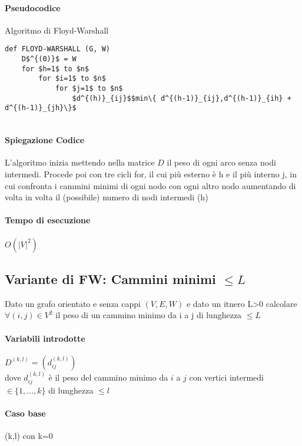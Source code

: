 \documentclass[12pt, a4paper, openany]{book}
\begin{document}
\paragraph{Pseudocodice} Algoritmo di Floyd-Warshall

\begin{lstlisting}
def FLOYD-WARSHALL (G, W)
    D$^{(0)}$ = W
    for $h=1$ to $n$
        for $i=1$ to $n$
            for $j=1$ to $n$
                $d^{(h)}_{ij}$$min\{ d^{(h-1)}_{ij},d^{(h-1)}_{ih} + d^{(h-1)}_{jh}\}$


\end{lstlisting}

\paragraph{Spiegazione Codice}
L'algoritmo inizia mettendo nella matrice $D$ il peso di ogni arco senza nodi intermedi.
Procede poi con tre cicli for, il cui più esterno è h e il più interno j, in cui confronta i cammini minimi
di ogni nodo con ogni altro nodo aumentando di volta in volta il (possibile) numero di nodi intermedi (h)

\paragraph{Tempo di esecuzione}
\begin{center}
	$O(|V|^2)$
\end{center}

\subsection*{Variante di FW: Cammini minimi $\leq L$}

Dato un grafo orientato e senza cappi $(V,E,W)$ e dato un itnero L\textgreater0 calcolare
$\forall (i,j) \in V^2$ il peso di un cammino minimo da i a j di lunghezza $\leq L$

\paragraph{Variabili introdotte} $D^{(k,l)}= (d^{(k,l)}_{ij})$ \\
dove $d^{(k,l)}_{ij}$ è il peso del cammino minimo da $i$ a $j$
con vertici intermedi $\in \{1,...,k\}$ di lunghezza $\leq l$

\paragraph{Caso base} (k,l) con k=0
\end{document}
